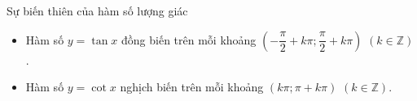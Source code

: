 \begin{dang}{Sự biến thiên của hàm số lượng giác}
\begin{itemize}
	\item Hàm số $y = \tan x$ đồng biến trên mỗi khoảng $\left(-\dfrac{\pi}{2}+k\pi;\dfrac{\pi}{2}+k\pi\right)$ $(k \in \mathbb{Z})$. 
	\item Hàm số $y = \cot x$ nghịch biến trên mỗi khoảng $\left(k\pi;\pi+k\pi\right)$ $(k \in \mathbb{Z})$. 
\end{itemize}
\end{dang}
